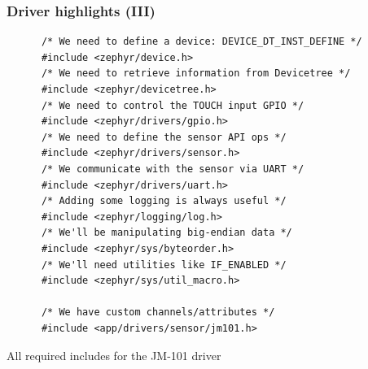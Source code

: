 \documentclass[handout]{beamer}
\begin{document}
\begin{frame}[fragile]
  \frametitle{Driver highlights (III)}

  \begin{listing}[H]
    \begin{verbatim}
      /* We need to define a device: DEVICE_DT_INST_DEFINE */
      #include <zephyr/device.h>
      /* We need to retrieve information from Devicetree */
      #include <zephyr/devicetree.h>
      /* We need to control the TOUCH input GPIO */
      #include <zephyr/drivers/gpio.h>
      /* We need to define the sensor API ops */
      #include <zephyr/drivers/sensor.h>
      /* We communicate with the sensor via UART */
      #include <zephyr/drivers/uart.h>
      /* Adding some logging is always useful */
      #include <zephyr/logging/log.h>
      /* We'll be manipulating big-endian data */
      #include <zephyr/sys/byteorder.h>
      /* We'll need utilities like IF_ENABLED */
      #include <zephyr/sys/util_macro.h>

      /* We have custom channels/attributes */
      #include <app/drivers/sensor/jm101.h>
    \end{verbatim}
    \caption{All required includes for the JM-101 driver}
  \end{listing}
\end{frame}
\end{document}
